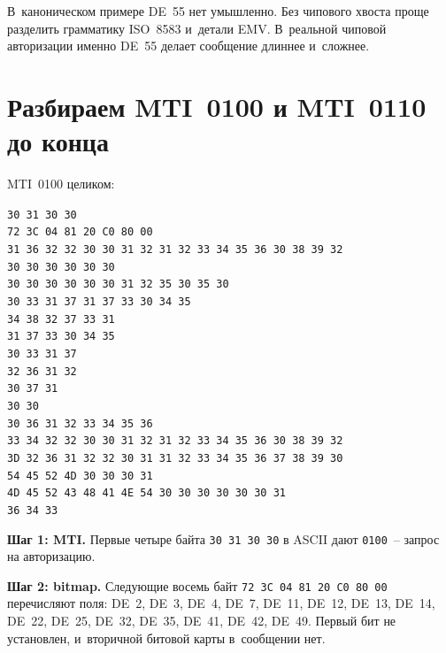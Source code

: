 В~каноническом примере DE~55 нет умышленно. Без чипового хвоста проще разделить грамматику ISO~8583 и~детали EMV. В~реальной чиповой авторизации именно DE~55 делает сообщение длиннее и~сложнее.

\section{Разбираем MTI~0100 и MTI~0110 до конца}\label{sec:iso8583-hex-dump}

MTI~0100 целиком:

\begin{center}
  \small
  \texttt{30 31 30 30}\\[2pt]
  \texttt{72 3C 04 81 20 C0 80 00}\\[2pt]
  \texttt{31 36 32 32 30 30 31 32 31 32 33 34 35 36 30 38 39 32}\\[2pt]
  \texttt{30 30 30 30 30 30}\\[2pt]
  \texttt{30 30 30 30 30 30 31 32 35 30 35 30}\\[2pt]
  \texttt{30 33 31 37 31 37 33 30 34 35}\\[2pt]
  \texttt{34 38 32 37 33 31}\\[2pt]
  \texttt{31 37 33 30 34 35}\\[2pt]
  \texttt{30 33 31 37}\\[2pt]
  \texttt{32 36 31 32}\\[2pt]
  \texttt{30 37 31}\\[2pt]
  \texttt{30 30}\\[2pt]
  \texttt{30 36 31 32 33 34 35 36}\\[2pt]
  \texttt{33 34 32 32 30 30 31 32 31 32 33 34 35 36 30 38 39 32}\\[2pt]
  \texttt{3D 32 36 31 32 32 30 31 31 32 33 34 35 36 37 38 39 30}\\[2pt]
  \texttt{54 45 52 4D 30 30 30 31}\\[2pt]
  \texttt{4D 45 52 43 48 41 4E 54 30 30 30 30 30 30 31}\\[2pt]
  \texttt{36 34 33}
\end{center}

\textbf{Шаг 1: MTI.} Первые четыре байта \texttt{30 31 30 30} в ASCII дают \texttt{0100}~-- запрос на авторизацию.

\textbf{Шаг 2: bitmap.} Следующие восемь байт \texttt{72 3C 04 81 20 C0 80 00} перечисляют поля: DE~2, DE~3, DE~4, DE~7, DE~11, DE~12, DE~13, DE~14, DE~22, DE~25, DE~32, DE~35, DE~41, DE~42, DE~49. Первый бит не установлен, и~вторичной битовой карты в~сообщении нет.

